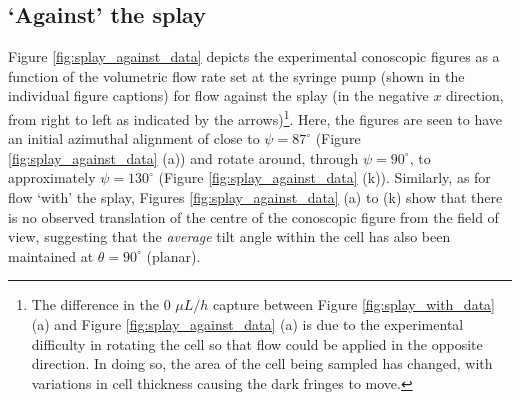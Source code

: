 \subsection{`Against' the splay}
Figure \ref{fig:splay_against_data} depicts the experimental conoscopic figures as a function of the volumetric flow rate set at the syringe pump (shown in the individual figure captions) for flow against the splay (in the negative $x$ direction, from right to left as indicated by the arrows)\footnote{The difference in the 0 $\mu L/h$ capture between Figure \ref{fig:splay_with_data} (a) and Figure \ref{fig:splay_against_data} (a) is due to the experimental difficulty in rotating the cell so that flow could be applied in the opposite direction. In doing so, the area of the cell being sampled has changed, with variations in cell thickness causing the dark fringes to move.}. Here, the figures are seen to have an initial azimuthal alignment of close to $\psi=87^{\circ}$ (Figure \ref{fig:splay_against_data} (a)) and rotate around, through $\psi=90^{\circ}$, to approximately $\psi=130^{\circ}$ (Figure \ref{fig:splay_against_data} (k)). Similarly, as for flow `with' the splay, Figures \ref{fig:splay_against_data} (a) to (k) show that there is no observed translation of the centre of the conoscopic figure from the field of view, suggesting that the \textit{average} tilt angle within the cell has also been maintained at $\theta=90^{\circ}$ (planar).

